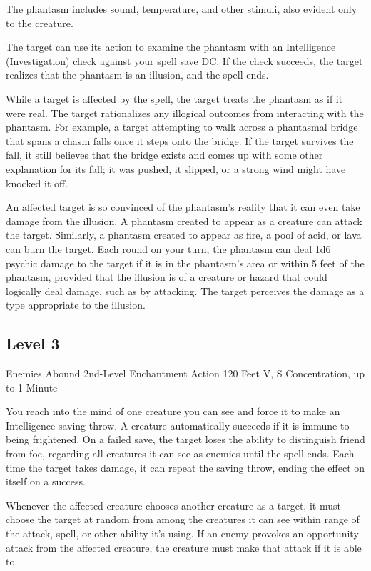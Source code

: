 \documentclass[letterpaper,openany,oneside,twocolumn]{book}
\begin{document}
The phantasm includes sound, temperature, and other stimuli, also evident only to the creature.

The target can use its action to examine the phantasm with an Intelligence (Investigation) check against your spell save DC. If the check succeeds, the target realizes that the phantasm is an illusion, and the spell ends.

While a target is affected by the spell, the target treats the phantasm as if it were real. The target rationalizes any illogical outcomes from interacting with the phantasm. For example, a target attempting to walk across a phantasmal bridge that spans a chasm falls once it steps onto the bridge. If the target survives the fall, it still believes that the bridge exists and comes up with some other explanation for its fall; it was pushed, it slipped, or a strong wind might have knocked it off.

An affected target is so convinced of the phantasm's reality that it can even take damage from the illusion. A phantasm created to appear as a creature can attack the target. Similarly, a phantasm created to appear as fire, a pool of acid, or lava can burn the target. Each round on your turn, the phantasm can deal 1d6 psychic damage to the target if it is in the phantasm's area or within 5 feet of the phantasm, provided that the illusion is of a creature or hazard that could logically deal damage, such as by attacking. The target perceives the damage as a type appropriate to the illusion.

\subsection*{Level 3}

\DndSpellHeader
  {Enemies Abound}
  {2nd-Level Enchantment}
  {Action}
  {120 Feet}
  {V, S}
  {Concentration, up to 1 Minute}

You reach into the mind of one creature you can see and force it to make an Intelligence saving throw. A creature automatically succeeds if it is immune to being frightened. On a failed save, the target loses the ability to distinguish friend from foe, regarding all creatures it can see as enemies until the spell ends. Each time the target takes damage, it can repeat the saving throw, ending the effect on itself on a success.

Whenever the affected creature chooses another creature as a target, it must choose the target at random from among the creatures it can see within range of the attack, spell, or other ability it's using. If an enemy provokes an opportunity attack from the affected creature, the creature must make that attack if it is able to.
\end{document}
